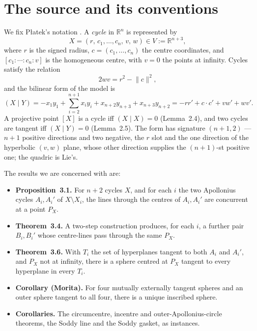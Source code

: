 \documentclass[11pt]{article}
\theoremstyle{definition}
\theoremstyle{remark}
\newcommand{\RR}{\mathbb{R}}
\begin{document}
\section{The source and its conventions}\label{sec:source}

We fix Płatek's notation \cite{platek}. A \emph{cycle} in $\RR^n$ is represented by
\[
X=(r,\,c_1,\dots,c_n,\,v,\,w)\in V:=\RR^{n+3},
\]
where $r$ is the signed radius, $c=(c_1,\dots,c_n)$ the centre coordinates, and $[c_1:\cdots:c_n:v]$
is the homogeneous centre, with $v=0$ the points at infinity. Cycles satisfy the relation
\begin{equation}\label{eq:def21}
2wv=r^2-\lVert c\rVert^2 ,
\end{equation}
and the bilinear form of the model is
\begin{equation}\label{eq:sourceform}
(X\mid Y)=-x_1y_1+\sum_{i=2}^{n+1}x_iy_i+x_{n+2}y_{n+3}+x_{n+3}y_{n+2}
=-rr'+c\cdot c'+vw'+wv' .
\end{equation}
A projective point $[X]$ is a cycle iff $(X\mid X)=0$ (Lemma~2.4), and two cycles are tangent iff
$(X\mid Y)=0$ (Lemma~2.5). The form has signature $(n+1,2)$ --- $n+1$ positive directions and two negative, the $r$ slot and the
one direction of the hyperbolic $(v,w)$ plane, whose other direction supplies the $(n+1)$-st positive
one; the quadric is Lie's.

The results we are concerned with are:

\begin{itemize}
\item \textbf{Proposition~3.1.} For $n+2$ cycles $X$, and for each $i$ the two Apollonius cycles
$A_i,A_i'$ of $X\setminus X_i$, the lines through the centres of $A_i,A_i'$ are concurrent at a
point $P_X$.
\item \textbf{Theorem~3.4.} A two-step construction produces, for each $i$, a further pair
$B_i,B_i'$ whose centre-lines pass through the same $P_X$.
\item \textbf{Theorem~3.6.} With $T_i$ the set of hyperplanes tangent to both $A_i$ and $A_i'$, and
$P_X$ not at infinity, there is a sphere centred at $P_X$ tangent to every hyperplane in every $T_i$.
\item \textbf{Corollary (Morita).} For four mutually externally tangent spheres and an outer sphere
tangent to all four, there is a unique inscribed sphere.
\item \textbf{Corollaries.} The circumcentre, incentre and outer-Apollonius-circle theorems, the
Soddy line and the Soddy gasket, as instances.
\end{itemize}
\end{document}
